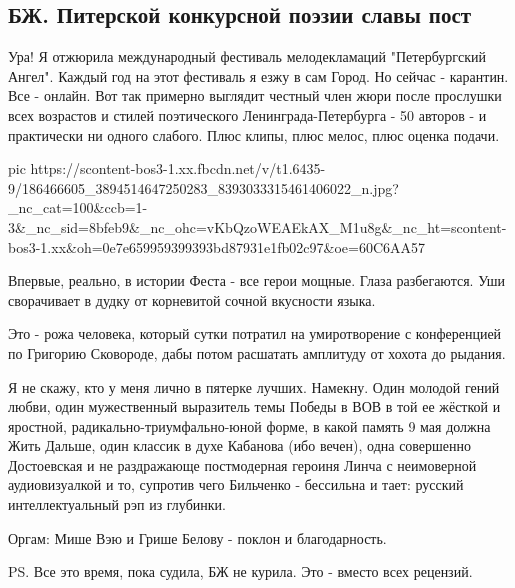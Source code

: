  
 
 
 
 
\subsection{БЖ. Питерской конкурсной поэзии славы пост}

Ура! Я отжюрила международный фестиваль мелодекламаций "Петербургский Ангел".
Каждый год на этот фестиваль я езжу в сам Город. Но сейчас - карантин. Все -
онлайн. Вот так примерно выглядит честный член жюри после прослушки всех
возрастов и стилей поэтического Ленинграда-Петербурга - 50 авторов - и
практически ни одного слабого. Плюс клипы, плюс мелос, плюс оценка подачи. 

\ifcmt
  pic https://scontent-bos3-1.xx.fbcdn.net/v/t1.6435-9/186466605_3894514647250283_8393033315461406022_n.jpg?_nc_cat=100&ccb=1-3&_nc_sid=8bfeb9&_nc_ohc=vKbQzoWEAEkAX_M1u8g&_nc_ht=scontent-bos3-1.xx&oh=0e7e659959399393bd87931e1fb02c97&oe=60C6AA57
\fi

Впервые, реально, в истории Феста - все герои мощные. Глаза разбегаются. Уши
сворачивает в дудку от корневитой сочной вкусности языка.

Это - рожа человека, который сутки потратил на умиротворение с конференцией по
Григорию Сковороде, дабы потом расшатать амплитуду от хохота до рыдания. 

Я не скажу, кто у меня лично в пятерке лучших. Намекну. Один молодой гений
любви, один мужественный выразитель темы Победы в ВОВ в той ее жёсткой и
яростной, радикально-триумфально-юной форме, в какой память 9 мая должна Жить
Дальше, один классик в духе Кабанова (ибо вечен), одна совершенно Достоевская и
не раздражающе постмодерная героиня Линча с неимоверной аудиовизуалкой и то,
супротив чего Бильченко - бессильна и тает: русский интеллектуальный рэп из
глубинки.

Оргам: Мише Вэю и Грише Белову - поклон и благодарность.

PS. Все это время, пока судила, БЖ не курила. Это - вместо всех рецензий.

